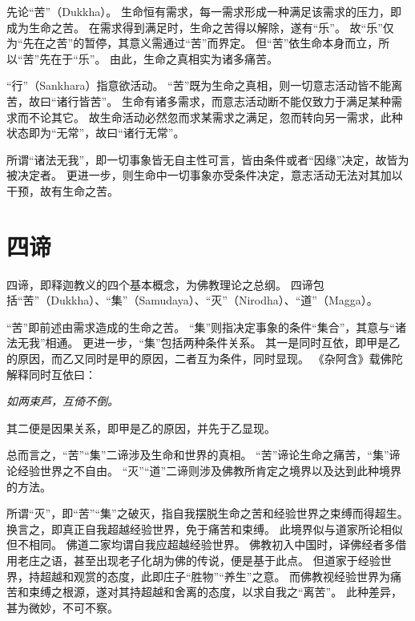 \documentclass[11pt]{article}
\begin{document}
\newline

先论“苦”（Dukkha）。
生命恒有需求，每一需求形成一种满足该需求的压力，即成为生命之苦。
在需求得到满足时，生命之苦得以解除，遂有“乐”。
故“乐”仅为“先在之苦”的暂停，其意义需通过“苦”而界定。
但“苦”依生命本身而立，所以“苦”先在于“乐”。
由此，生命之真相实为诸多痛苦。

\newline

“行”（Sankhara）指意欲活动。
“苦”既为生命之真相，则一切意志活动皆不能离苦，故曰“诸行皆苦”。
生命有诸多需求，而意志活动断不能仅致力于满足某种需求而不论其它。
故生命活动必然忽而求某需求之满足，忽而转向另一需求，此种状态即为“无常”，故曰“诸行无常”。

\newline

所谓“诸法无我”，即一切事象皆无自主性可言，皆由条件或者“因缘”决定，故皆为被决定者。
更进一步，则生命中一切事象亦受条件决定，意志活动无法对其加以干预，故有生命之苦。

\section{四谛}
四谛，即释迦教义的四个基本概念，为佛教理论之总纲。
四谛包括“苦”（Dukkha）、“集”（Samudaya）、“灭”（Nirodha）、“道”（Magga）。

\newline

“苦”即前述由需求造成的生命之苦。
“集”则指决定事象的条件“集合”，其意与“诸法无我”相通。
更进一步，“集”包括两种条件关系。
其一是同时互依，即甲是乙的原因，而乙又同时是甲的原因，二者互为条件，同时显现。
《杂阿含》载佛陀解释同时互依曰：

\textit{如两束芦，互倚不倒。}

其二便是因果关系，即甲是乙的原因，并先于乙显现。

\newline

总而言之，“苦”“集”二谛涉及生命和世界的真相。
“苦”谛论生命之痛苦，“集”谛论经验世界之不自由。
“灭”“道”二谛则涉及佛教所肯定之境界以及达到此种境界的方法。

\newline

所谓“灭”，即“苦”“集”之破灭，指自我摆脱生命之苦和经验世界之束缚而得超生。
换言之，即真正自我超越经验世界，免于痛苦和束缚。
此境界似与道家所论相似但不相同。
佛道二家均谓自我应超越经验世界。
佛教初入中国时，译佛经者多借用老庄之语，甚至出现老子化胡为佛的传说，便是基于此点。
但道家于经验世界，持超越和观赏的态度，此即庄子“胜物”“养生”之意。
而佛教视经验世界为痛苦和束缚之根源，遂对其持超越和舍离的态度，以求自我之“离苦”。
此种差异，甚为微妙，不可不察。
\end{document}
